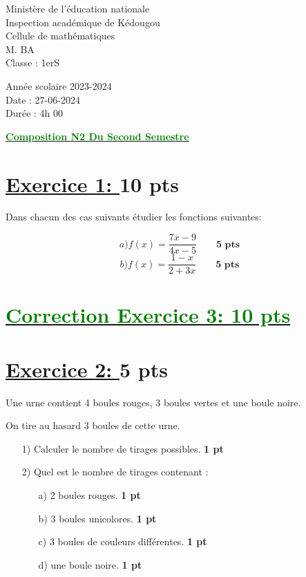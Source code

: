 \documentclass[12pt]{article}
\begin{document}
\begin{minipage}{0.5\textwidth}
	Ministère de l'éducation nationale  \\
	Inspection académique de Kédougou   \\
	Cellule de mathématiques            \\
	M. BA\\
	Classe : 1erS
\end{minipage}
\begin{minipage}{0.5\textwidth}
	Année scolaire 2023-2024 \\
	Date : 27-06-2024 \\
	Durée : 4h 00 \\
\end{minipage}

\begin{center}
	\textbf{{\underline{\textcolor{green}{Composition N2 Du Second Semestre}}}}
\end{center}
\section*{\underline{Exercice 1: }\textbf{10 pts}}
Dans chacun des cas suivants étudier les fonctions suivantes:

\[a)f(x)=\frac{7x-9}{4x-5}\quad\quad\textbf{5 pts}\]
\[b)f(x)=\frac{1-x}{2+3x}\quad\quad\textbf{5 pts}\]
\section*{\underline{\textcolor{green}{Correction Exercice 3: \textbf{10 pts}}}}
\section*{\underline{Exercice 2: }\textbf{5 pts}}
Une urne contient 4 boules rouges, 3 boules vertes et une boule noire.

On tire au hasard 3 boules de cette urne.

\begin{itemize}
\item[1)] Calculer le nombre de tirages possibles. \textbf{1 pt}
\item[2)] Quel est le nombre de tirages contenant :
\begin{itemize}
\item[a)] 2 boules rouges. \textbf{1 pt}
\item[b)] 3 boules unicolores. \textbf{1 pt}
\item[c)] 3 boules de couleurs différentes. \textbf{1 pt}
\item[d)] une boule noire. \textbf{1 pt}
\end{itemize}
\end{itemize}
\end{document}
